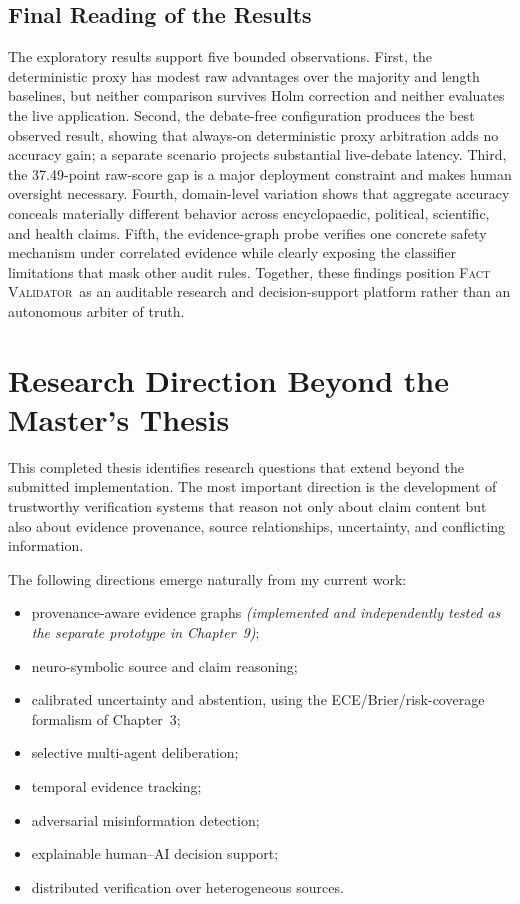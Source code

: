 \documentclass[12pt,a4paper,openany]{report}
\newcommand{\system}{\textsc{Fact Validator}}
\begin{document}
\section{Final Reading of the Results}
The exploratory results support five bounded observations. First, the deterministic proxy
has modest raw advantages over the majority and length baselines, but neither
comparison survives Holm correction and neither evaluates the live application.
Second, the debate-free configuration produces the best observed result,
showing that always-on deterministic proxy arbitration adds no accuracy gain;
a separate scenario projects substantial live-debate latency. Third, the
37.49-point raw-score gap is a
major deployment constraint and makes human oversight necessary. Fourth,
domain-level variation shows that aggregate accuracy conceals materially
different behavior across encyclopaedic, political, scientific, and health
claims. Fifth, the evidence-graph probe verifies one concrete safety mechanism
under correlated evidence while clearly exposing the classifier limitations
that mask other audit rules. Together, these findings position \system\ as an
auditable research and decision-support platform rather than an autonomous
arbiter of truth.

\chapter{Research Direction Beyond the Master's Thesis}
This completed thesis identifies research questions that extend beyond the submitted implementation. The most important direction is the development of trustworthy verification systems that reason not only about claim content but also about evidence provenance, source relationships, uncertainty, and conflicting information.

The following directions emerge naturally from my current work:
\begin{itemize}
  \item provenance-aware evidence graphs \emph{(implemented and independently tested as the separate prototype in Chapter~9)};
  \item neuro-symbolic source and claim reasoning;
  \item calibrated uncertainty and abstention, using the ECE/Brier/risk-coverage formalism of Chapter~3;
  \item selective multi-agent deliberation;
  \item temporal evidence tracking;
  \item adversarial misinformation detection;
  \item explainable human--AI decision support;
  \item distributed verification over heterogeneous sources.
\end{itemize}
\end{document}
